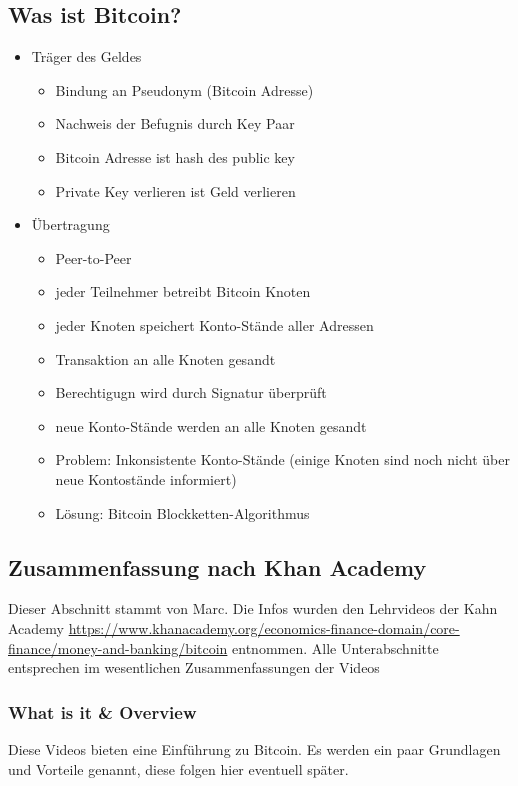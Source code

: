 \documentclass{article} %
\begin{document}
	\subsection{Was ist Bitcoin?}
	\begin{itemize}
		\item Träger des Geldes
		\begin{itemize}
			\item Bindung an Pseudonym (Bitcoin Adresse)
			\item Nachweis der Befugnis durch Key Paar
			\item Bitcoin Adresse ist hash des public key
			\item Private Key verlieren ist Geld verlieren
		\end{itemize}
		\item Übertragung
		\begin{itemize}
			\item Peer-to-Peer
			\item jeder Teilnehmer betreibt Bitcoin Knoten
			\item jeder Knoten speichert Konto-Stände aller Adressen
			\item Transaktion an alle Knoten gesandt
			\item Berechtigugn wird durch Signatur überprüft
			\item neue Konto-Stände werden an alle Knoten gesandt
			\item Problem: Inkonsistente Konto-Stände (einige Knoten sind noch nicht über neue Kontostände informiert)
			\item Lösung: Bitcoin Blockketten-Algorithmus
		\end{itemize}
	\end{itemize}
	\subsection{Zusammenfassung nach Khan Academy}
	Dieser Abschnitt stammt von Marc.
	Die Infos wurden den Lehrvideos der Kahn Academy \url{https://www.khanacademy.org/economics-finance-domain/core-finance/money-and-banking/bitcoin} entnommen.
	Alle Unterabschnitte entsprechen im wesentlichen Zusammenfassungen der Videos
	\subsubsection{What is it \& Overview}
	Diese Videos bieten eine Einführung zu Bitcoin.
	Es werden ein paar Grundlagen und Vorteile genannt, diese folgen hier eventuell später.
\end{document}
